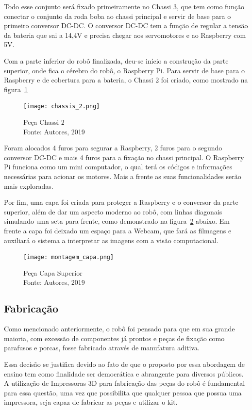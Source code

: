 Todo esse conjunto será fixado primeiramente no Chassi 3, que tem como função conectar o conjunto da roda boba ao chassi principal e servir de base para o primeiro conversor DC-DC. O conversor DC-DC tem a função de regular a tensão da bateria que sai a 14,4V e precisa chegar aos servomotores e ao Raspberry com 5V.

Com a parte inferior do robô finalizada, deu-se início a construção da parte superior, onde fica o cérebro do robô, o Raspberry Pi. Para servir de base para o Raspberry e de cobertura para a bateria, o Chassi 2 foi criado, como mostrado na figura~\ref{fig:chassi_2}

\begin{figure}[h!]
	\centering
	\texttt{[image: chassis\_2.png]}\\
	\caption{Peça Chassi 2 \\ Fonte: Autores, 2019}
	\label{fig:chassi_2}
\end{figure}

Foram alocados 4 furos para segurar a Raspberry, 2 furos para o segundo conversor DC-DC e mais 4 furos para a fixação no chassi principal. O Raspberry Pi funciona como um mini computador, o qual terá os códigos e informações necessárias para acionar os
motores. Mais a frente as suas funcionalidades serão mais exploradas.

Por fim, uma capa foi criada para proteger a Raspberry e o conversor da parte superior, além de dar um aspecto moderno ao robô, com linhas diagonais simulando uma seta para frente, como demonstrado na figura~\ref{fig:capa} abaixo. Em frente a capa foi deixado um espaço para a Webcam, que fará as filmagens e auxiliará o sistema a interpretar as imagens com a visão computacional.

\begin{figure}[h!]
	\centering
	\texttt{[image: montagem\_capa.png]}\\
	\caption{Peça Capa Superior \\ Fonte: Autores, 2019}
	\label{fig:capa}
\end{figure}

\subsection{Fabricação}
Como mencionado anteriormente, o robô foi pensado para que em sua grande maioria, com excessão de componentes já prontos e peças de fixação como parafusos e porcas, fosse fabricado através de manufatura aditiva.

Essa decisão se justifica devido ao fato de que o proposto por essa abordagem de ensino tem como finalidade ser democrática e abrangente para diversos públicos. A utilização de Impressoras 3D para fabricação das peças do robô é fundamental para essa questão, uma vez que possibilita que qualquer pessoa que possua uma impressora, seja capaz de fabricar as peças e utilizar o kit.

